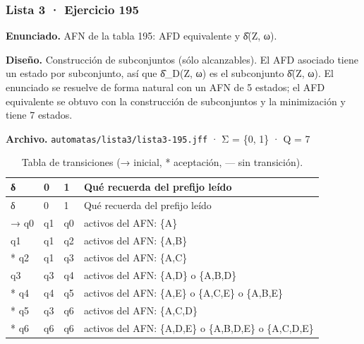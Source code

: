 
\hypertarget{lista-3-ejercicio-195}{%
\subsubsection{Lista 3 · Ejercicio 195}\label{lista-3-ejercicio-195}}

\textbf{Enunciado.} AFN de la tabla 195: AFD equivalente y δ̂(Z, ω).

\textbf{Diseño.} Construcción de subconjuntos (sólo alcanzables). El AFD asociado tiene un estado por subconjunto, así que δ̂\_D(Z, ω) es el subconjunto δ̂(Z, ω). El enunciado se resuelve de forma natural con un AFN de 5 estados; el AFD equivalente se obtuvo con la construcción de subconjuntos y la minimización y tiene 7 estados.

\textbf{Archivo.} \texttt{automatas/lista3/lista3-195.jff} · Σ = \{0, 1\} · \textbar Q\textbar{} = 7

\begin{longtable}[]{@{}llll@{}}
\caption{Tabla de transiciones (→ inicial, * aceptación, --- sin transición).}\tabularnewline
\toprule\noalign{}
δ & 0 & 1 & Qué recuerda del prefijo leído \\
\midrule\noalign{}
\endfirsthead
\toprule\noalign{}
δ & 0 & 1 & Qué recuerda del prefijo leído \\
\midrule\noalign{}
\endhead
\bottomrule\noalign{}
\endlastfoot
→ q0 & q1 & q0 & activos del AFN: \{A\} \\
q1 & q1 & q2 & activos del AFN: \{A,B\} \\
* q2 & q1 & q3 & activos del AFN: \{A,C\} \\
q3 & q3 & q4 & activos del AFN: \{A,D\} o \{A,B,D\} \\
* q4 & q4 & q5 & activos del AFN: \{A,E\} o \{A,C,E\} o \{A,B,E\} \\
* q5 & q3 & q6 & activos del AFN: \{A,C,D\} \\
* q6 & q6 & q6 & activos del AFN: \{A,D,E\} o \{A,B,D,E\} o \{A,C,D,E\} \\
\end{longtable}

